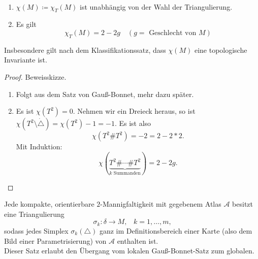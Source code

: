 \begin{theorem}
  \
  \begin{enumerate}
    \item \( \chi(M) \coloneqq \chi_T(M) \) ist unabhängig von der Wahl der Triangulierung.
    \item Es gilt
    \begin{equation*}
      \chi_T(M) = 2-2g \quad (g = \text{ Geschlecht von } M)
    \end{equation*}
  \end{enumerate}
  Insbesondere gilt nach dem Klassifikationssatz, dass \( \chi(M) \) eine topologische Invariante ist.
  \begin{proof}
    Beweisskizze.
    \begin{enumerate}
      \item Folgt aus dem Satz von Gauß-Bonnet, mehr dazu später.
      \item Es ist \( \chi(T^2) = 0 \). Nehmen wir ein Dreieck heraus, so ist \( \chi(T^2 \setminus \dot{\triangle}) = \chi(T^2) - 1 = -1 \). Es ist also
      \begin{equation*}
        \chi(T^2 \# T^2) = -2 = 2 - 2*2\text{.}
      \end{equation*}
      Mit Induktion:
      \begin{equation*}
        \chi(\underbrace{T^2 \# \cdots \# T^2}_{k \text{ Summanden}}) = 2-2g\text{.}
      \end{equation*}
    \end{enumerate}
  \end{proof}
\end{theorem}

\begin{theorem}
  Jede kompakte, orientierbare \( 2 \)-Mannigfaltigkeit mit gegebenem Atlas \( \mathcal{A} \) besitzt eine Triangulierung
  \begin{equation*}
    \sigma_k : \delta \to M\text{,} \quad k = 1,\dots,m\text{,}
  \end{equation*}
  sodass jedes Simplex \( \sigma_k(\triangle) \) ganz im Definitionsbereich einer Karte (also dem Bild einer Parametrisierung) von \( \mathcal{A} \) enthalten ist. \\
  Dieser Satz erlaubt den Übergang vom lokalen Gauß-Bonnet-Satz zum globalen.
\end{theorem}

